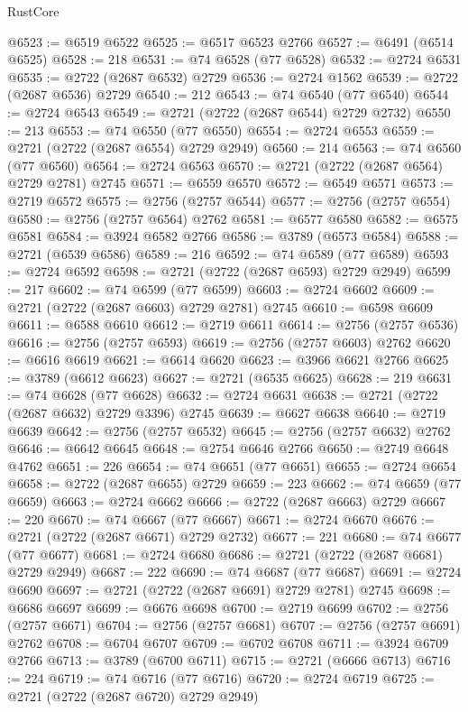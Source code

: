 \begin{lexlean}{RustCore}
\begin{coremodule}
@6523 := @6519 @6522
@6525 := @6517 @6523 @2766
@6527 := @6491 (@6514 @6525)
@6528 := 218
@6531 := @74 @6528 (@77 @6528)
@6532 := @2724 @6531
@6535 := @2722 (@2687 @6532) @2729
@6536 := @2724 @1562
@6539 := @2722 (@2687 @6536) @2729
@6540 := 212
@6543 := @74 @6540 (@77 @6540)
@6544 := @2724 @6543
@6549 := @2721 (@2722 (@2687 @6544) @2729 @2732)
@6550 := 213
@6553 := @74 @6550 (@77 @6550)
@6554 := @2724 @6553
@6559 := @2721 (@2722 (@2687 @6554) @2729 @2949)
@6560 := 214
@6563 := @74 @6560 (@77 @6560)
@6564 := @2724 @6563
@6570 := @2721 (@2722 (@2687 @6564) @2729 @2781) @2745
@6571 := @6559 @6570
@6572 := @6549 @6571
@6573 := @2719 @6572
@6575 := @2756 (@2757 @6544)
@6577 := @2756 (@2757 @6554)
@6580 := @2756 (@2757 @6564) @2762
@6581 := @6577 @6580
@6582 := @6575 @6581
@6584 := @3924 @6582 @2766
@6586 := @3789 (@6573 @6584)
@6588 := @2721 (@6539 @6586)
@6589 := 216
@6592 := @74 @6589 (@77 @6589)
@6593 := @2724 @6592
@6598 := @2721 (@2722 (@2687 @6593) @2729 @2949)
@6599 := 217
@6602 := @74 @6599 (@77 @6599)
@6603 := @2724 @6602
@6609 := @2721 (@2722 (@2687 @6603) @2729 @2781) @2745
@6610 := @6598 @6609
@6611 := @6588 @6610
@6612 := @2719 @6611
@6614 := @2756 (@2757 @6536)
@6616 := @2756 (@2757 @6593)
@6619 := @2756 (@2757 @6603) @2762
@6620 := @6616 @6619
@6621 := @6614 @6620
@6623 := @3966 @6621 @2766
@6625 := @3789 (@6612 @6623)
@6627 := @2721 (@6535 @6625)
@6628 := 219
@6631 := @74 @6628 (@77 @6628)
@6632 := @2724 @6631
@6638 := @2721 (@2722 (@2687 @6632) @2729 @3396) @2745
@6639 := @6627 @6638
@6640 := @2719 @6639
@6642 := @2756 (@2757 @6532)
@6645 := @2756 (@2757 @6632) @2762
@6646 := @6642 @6645
@6648 := @2754 @6646 @2766
@6650 := @2749 @6648 @4762
@6651 := 226
@6654 := @74 @6651 (@77 @6651)
@6655 := @2724 @6654
@6658 := @2722 (@2687 @6655) @2729
@6659 := 223
@6662 := @74 @6659 (@77 @6659)
@6663 := @2724 @6662
@6666 := @2722 (@2687 @6663) @2729
@6667 := 220
@6670 := @74 @6667 (@77 @6667)
@6671 := @2724 @6670
@6676 := @2721 (@2722 (@2687 @6671) @2729 @2732)
@6677 := 221
@6680 := @74 @6677 (@77 @6677)
@6681 := @2724 @6680
@6686 := @2721 (@2722 (@2687 @6681) @2729 @2949)
@6687 := 222
@6690 := @74 @6687 (@77 @6687)
@6691 := @2724 @6690
@6697 := @2721 (@2722 (@2687 @6691) @2729 @2781) @2745
@6698 := @6686 @6697
@6699 := @6676 @6698
@6700 := @2719 @6699
@6702 := @2756 (@2757 @6671)
@6704 := @2756 (@2757 @6681)
@6707 := @2756 (@2757 @6691) @2762
@6708 := @6704 @6707
@6709 := @6702 @6708
@6711 := @3924 @6709 @2766
@6713 := @3789 (@6700 @6711)
@6715 := @2721 (@6666 @6713)
@6716 := 224
@6719 := @74 @6716 (@77 @6716)
@6720 := @2724 @6719
@6725 := @2721 (@2722 (@2687 @6720) @2729 @2949)

\end{coremodule}
\end{lexlean}
